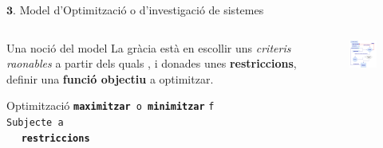 \documentclass[twocolumn]{beamer}
\begin{document}
\begin{frame}{$\mathbf 3.$ Model d’Optimització o d’investigació de sistemes}
\begin{columns}[t]
\begin{column}{.5\textwidth}
	\begin{block}{Una noció del model}
		La gràcia està en escollir uns \emph{criteris raonables}
		a partir dels quals , i donades unes \textbf{restriccions}, definir una \textbf{funció objectiu} a optimitzar.
	\end{block}

\begin{block}{Optimització}
\texttt{\textbf{maximitzar} o \textbf{minimitzar}} \texttt{f}
\\ 
\texttt{Subjecte a}
\\
$\quad $ \texttt{\textbf{restriccions}}
\end{block}
\end{column}
\begin{column}{.5\textwidth}
\begin{figure}
\includegraphics[width=6cm]{algor}
\end{figure}
\end{column}
\end{columns}
\end{frame}
\end{document}
